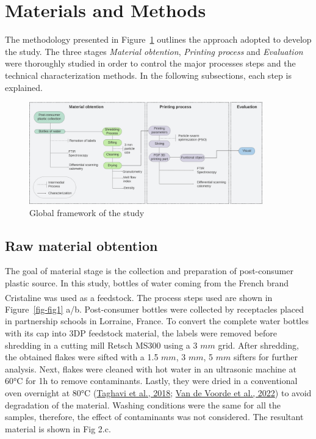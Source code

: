 \documentclass[
  12pt,
]{article}
\begin{document}
\hypertarget{materials-and-methods}{%
\section{Materials and Methods}\label{materials-and-methods}}

The methodology presented in Figure~\ref{fig-1} outlines the approach
adopted to develop the study. The three stages \emph{Material
obtention}, \emph{Printing process} and \emph{Evaluation} were
thoroughly studied in order to control the major processes steps and the
technical characterization methods. In the following subsections, each
step is explained.

\begin{figure}

{\centering \includegraphics[width=0.9\textwidth,height=\textheight]{figures/Fig_1_framework.png}

}

\caption{\label{fig-1}Global framework of the study}

\end{figure}

\hypertarget{raw-material-obtention}{%
\subsection{Raw material obtention}\label{raw-material-obtention}}

The goal of material stage is the collection and preparation of
post-consumer plastic source. In this study, bottles of water coming
from the French brand Cristaline\textsuperscript{\textcopyright} was
used as a feedstock. The process steps used are shown in
Figure~\ref{fig-fig1} a/b. Post-consumer bottles were collected by
receptacles placed in partnership schools in Lorraine, France. To
convert the complete water bottles with its cap into 3DP feedstock
material, the labels were removed before shredding in a cutting mill
Retsch MS300 using a 3 \(mm\) grid. After shredding, the obtained flakes
were sifted with a 1.5 \(mm\), 3 \(mm\), 5 \(mm\) sifters for further
analysis. Next, flakes were cleaned with hot water in an ultrasonic
machine at 60°C for 1h to remove contaminants. Lastly, they were dried
in a conventional oven overnight at 80°C
(\protect\hyperlink{ref-taghavi2018}{Taghavi et al., 2018};
\protect\hyperlink{ref-vandevoorde2022}{Van de Voorde et al., 2022}) to
avoid degradation of the material. Washing conditions were the same for
all the samples, therefore, the effect of contaminants was not
considered. The resultant material is shown in Fig 2.c.
\end{document}
